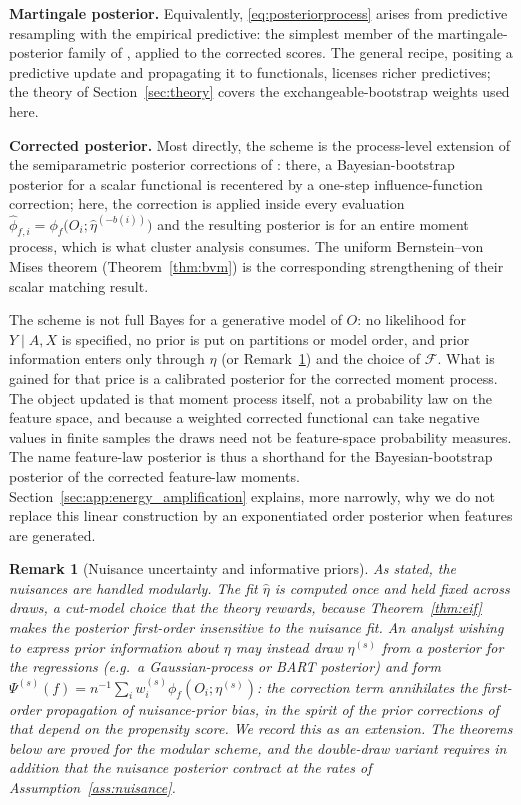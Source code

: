 \documentclass[11pt]{article}
\newtheorem{remark}{Remark}
\newcommand{\calF}{\mathcal F}
\newcommand{\hateta}{\widehat\eta}
\newcommand{\hphi}{\widehat\phi}
\begin{document}
\textbf{Martingale posterior.} Equivalently, \eqref{eq:posteriorprocess} arises from predictive resampling with the empirical predictive: the simplest member of the martingale-posterior family of \cite{fong2023}, applied to the corrected scores. The general recipe, positing a predictive update and propagating it to functionals, licenses richer predictives; the theory of Section~\ref{sec:theory} covers the exchangeable-bootstrap weights used here.

\textbf{Corrected posterior.} Most directly, the scheme is the process-level extension of the semiparametric posterior corrections of \cite{yiu2025}: there, a Bayesian-bootstrap posterior for a scalar functional is recentered by a one-step influence-function correction; here, the correction is applied inside every evaluation $\hphi_{f,i}=\phi_f\bigl(O_i;\hateta^{(-b(i))}\bigr)$ and the resulting posterior is for an entire moment process, which is what cluster analysis consumes. The uniform Bernstein--von Mises theorem (Theorem~\ref{thm:bvm}) is the corresponding strengthening of their scalar matching result.


The scheme is not full Bayes for a generative model of $O$: no likelihood for $Y\mid A,X$ is specified, no prior is put on partitions or model order, and prior information enters only through $\hateta$ (or Remark~\ref{rem:informative}) and the choice of $\calF$. What is gained for that price is a calibrated posterior for the corrected moment process.  The object updated is that moment process itself, not a probability law on the feature space, and because a weighted corrected functional can take negative values in finite samples the draws need not be feature-space probability measures. The name feature-law posterior is thus a shorthand for the Bayesian-bootstrap posterior of the corrected feature-law moments.  Section~\ref{sec:app:energy_amplification} explains, more narrowly, why we do not replace this linear construction by an exponentiated order posterior when features are generated.


\begin{remark}[Nuisance uncertainty and informative priors]\label{rem:informative}
As stated, the nuisances are handled modularly. The fit $\hateta$ is computed once and held fixed across draws, a cut-model choice that the theory rewards, because Theorem~\ref{thm:eif} makes the posterior first-order insensitive to the nuisance fit. An analyst wishing to express prior information about $\eta$ may instead draw $\eta^{(s)}$ from a posterior for the regressions (e.g.\ a Gaussian-process or BART posterior) and form $\Psi^{(s)}(f)=n^{-1}\sum_i w^{(s)}_i\phi_f(O_i;\eta^{(s)})$: the correction term annihilates the first-order propagation of nuisance-prior bias, in the spirit of the prior corrections of \cite{ray2020} that depend on the propensity score. We record this as an extension. The theorems below are proved for the modular scheme, and the double-draw variant requires in addition that the nuisance posterior contract at the rates of Assumption~\ref{ass:nuisance}.
\end{remark}
\end{document}
